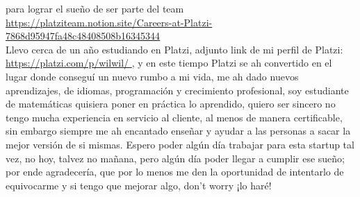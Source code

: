 \documentclass{article}
\begin{document}
    para lograr el sueño de ser parte del team\\ 
    \url{https://platziteam.notion.site/Careers-at-Platzi-7868d95947fa48c48408508b16345344} \\ 
    Llevo cerca de un año estudiando en Platzi, adjunto link de mi perfil de Platzi: \url{ https://platzi.com/p/wilwil/ } , y en este tiempo
Platzi se ah convertido en el lugar donde conseguí un nuevo rumbo a mi vida, me ah dado nuevos aprendizajes, de idiomas, programación y crecimiento profesional, soy estudiante de matemáticas quisiera poner en práctica lo aprendido, quiero ser sincero no tengo mucha experiencia en servicio al cliente, al menos de manera certificable, sin embargo siempre me ah encantado enseñar y ayudar a las personas a sacar la mejor versión de si mismas. 
Espero poder algún día trabajar para esta startup tal vez, no hoy, talvez no mañana, pero algún día poder llegar a cumplir ese sueño; por ende agradecería, que por lo menos me den la oportunidad de intentarlo de equivocarme y si tengo que mejorar algo, don't worry ¡lo haré!
\end{document}
